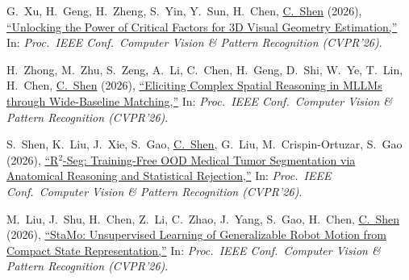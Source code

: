 \documentclass[9pt, a4paper]{article}
\newcommand{\years}[1]{\marginnote{\scriptsize #1}}
\def\highlight{\uline}
\begin{document}
\medskip

\years{2026} G.~Xu, H.~Geng, H.~Zheng, S.~Yin, Y.~Sun, H.~Chen, \highlight{C.~Shen} (2026),
\href{http://www.google.com/search?lr=&ie=UTF-8&oe=UTF-8&q=Unlocking+the+Power+of+Critical+Factors+for+3D+Visual+Geometry+Estimation+Guangkai+Xu%2C+Hua+Geng%2C+Huanyi+Zheng%2C+Songyi+Yin%2C+Yanlong+Sun%2C+Hao+Chen%2C+Chunhua+Shen}{``Unlocking the Power of Critical Factors for {3D} Visual Geometry Estimation,{}''}
In: \emph{Proc.\ IEEE Conf.\  Computer Vision \& Pattern Recognition (CVPR'26)}.

\medskip

\years{2026} H.~Zhong, M.~Zhu, S.~Zeng, A.~Li, C.~Chen, H.~Geng, D.~Shi, W.~Ye, T.~Lin, H.~Chen, \highlight{C.~Shen} (2026),
\href{http://www.google.com/search?lr=&ie=UTF-8&oe=UTF-8&q=Eliciting+Complex+Spatial+Reasoning+in+MLLMs+through+Wide-Baseline+Matching+Hao+Zhong%2C+Muzhi+Zhu%2C+Shenyan+Zeng%2C+Anzhou+Li%2C+Cong+Chen%2C+Hua+Geng%2C+Duochao+Shi%2C+Wentao+Ye%2C+Tao+Lin%2C+Hao+Chen%2C+Chunhua+Shen}{``Eliciting Complex Spatial Reasoning in {MLLMs} through Wide-Baseline Matching,{}''}
In: \emph{Proc.\ IEEE Conf.\  Computer Vision \& Pattern Recognition (CVPR'26)}.

\medskip

\years{2026} S.~Shen, K.~Liu, J.~Xie, S.~Gao, \highlight{C.~Shen}, G.~Liu, M.~Crispin-Ortuzar, S.~Gao (2026),
\href{http://www.google.com/search?lr=&ie=UTF-8&oe=UTF-8&q=R-Seg%3A+Training-Free+OOD+Medical+Tumor+Segmentation+via+Anatomical+Reasoning+and+Statistical+Rejection+Shuaike+Shen%2C+Ke+Liu%2C+Jiaqing+Xie%2C+Shangde+Gao%2C+Chunhua+Shen%2C+Ge+Liu%2C+Mireia+Crispin-Ortuzar%2C+Shangqi+Gao}{``R$^2$-Seg: Training-Free {OOD} Medical Tumor Segmentation via Anatomical Reasoning and Statistical Rejection,{}''}
In: \emph{Proc.\ IEEE Conf.\  Computer Vision \& Pattern Recognition (CVPR'26)}.

\medskip

\years{2026} M.~Liu, J.~Shu, H.~Chen, Z.~Li, C.~Zhao, J.~Yang, S.~Gao, H.~Chen, \highlight{C.~Shen} (2026),
\href{http://www.google.com/search?lr=&ie=UTF-8&oe=UTF-8&q=StaMo%3A+Unsupervised+Learning+of+Generalizable+Robot+Motion+from+Compact+State+Representation+Mingyu+Liu%2C+Jiuhe+Shu%2C+Hui+Chen%2C+Zeju+Li%2C+Canyu+Zhao%2C+Jiange+Yang%2C+Shenyuan+Gao%2C+Hao+Chen%2C+Chunhua+Shen}{``{StaMo}: Unsupervised Learning of Generalizable Robot Motion from Compact State Representation,{}''}
In: \emph{Proc.\ IEEE Conf.\  Computer Vision \& Pattern Recognition (CVPR'26)}.

\medskip
\end{document}
